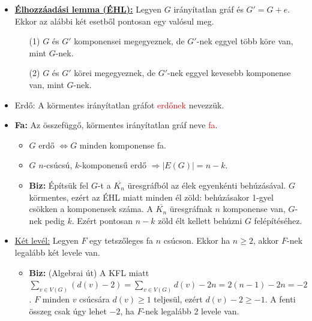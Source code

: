 \documentclass[../../szobeli.tex]{subfiles}
\begin{document}
\begin{center}
    \noindent{}
\end{center}
    \begin{itemize}
        \item \underline{\textbf{Élhozzáadási lemma (ÉHL):}} Legyen $G$ irányítatlan gráf és $G' = G + e$. Ekkor az alábbi két esetből pontosan egy valósul meg. 
            \begin{itemize} 
                \item[(1)] $G$ és $G'$ komponensei megegyeznek, de $G'$-nek eggyel több köre van, mint $G$-nek.
                \item[(2)] $G$ és $G'$ körei megegyeznek, de $G'$-nek eggyel kevesebb komponense van, mint $G$-nek. 
            \end{itemize}
        \item Erdő: A körmentes irányítatlan gráfot \textcolor{red}{erdőnek} nevezzük. 
        \item \textbf{Fa:} Az összefüggő, körmentes irányítatlan gráf neve \textcolor{red}{fa}. 
            \begin{itemize}
                \item $G$ erdő $\Longleftrightarrow  G$ minden komponense fa.
                \item $G$ $n$-csúcsú, $k$-komponensű erdő $\Rightarrow |E(G)| = n-k$.
                \item \textbf{Biz:} Építsük fel $G$-t a $\overline{K_n}$ üresgráfból az élek egyenkénti behúzásával. $G$ körmentes, ezért az ÉHL miatt minden él zöld: behúzásakor 1-gyel csökken a komponensek száma. A $\overline{K_n}$ üresgráfnak $n$ komponense van, $G$-nek pedig $k$. Ezért pontosan $n-k$ zöld élt kellett behúzni $G$ felépítéséhez.
            \end{itemize}
        \item \underline{Két levél:} Legyen $F$ egy tetszőleges fa $n$ csúcson. Ekkor ha $n \geq 2$, akkor $F$-nek legalább két levele van.
            \begin{itemize}
                \item \textbf{Biz:} (Algebrai út) A KFL miatt $\sum_{v\in V(G)}(d(v)-2)=\sum_{v\in V(G)}d(v)-2n=2(n-1)-2n=-2$. $F$ minden $v$ csúcsára $d(v) \geq 1$ teljesül, ezért $d(v) - 2 \geq -1$. A fenti összeg csak úgy lehet $-2$, ha $F$-nek legalább 2 levele van.

\end{itemize}
\end{itemize}
\end{document}
